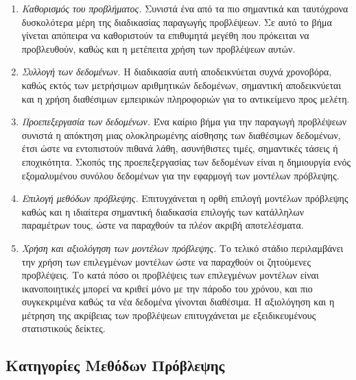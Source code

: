 \documentclass[diploma]{softlab-thesis}
\begin{document}
\begin{enumerate}
    \item \textit{Καθορισμός του προβλήματος.} Συνιστά ένα από τα πιο σημαντικά και ταυτόχρονα δυσκολότερα μέρη της διαδικασίας παραγωγής προβλέψεων. Σε αυτό το βήμα γίνεται απόπειρα να καθοριστούν τα επιθυμητά μεγέθη που πρόκειται να προβλευθούν, καθώς και η μετέπειτα χρήση των προβλέψεων αυτών.
    \item \textit{Συλλογή των δεδομένων.} Η διαδικασία αυτή αποδεικνύεται συχνά χρονοβόρα, καθώς εκτός των μετρήσιμων αριθμητικών δεδομένων, σημαντική αποδεικνύεται και η χρήση διαθέσιμων εμπειρικών πληροφοριών για το αντικείμενο προς μελέτη. 
    \item \textit{Προεπεξεργασία των δεδομένων.} Ένα καίριο βήμα για την παραγωγή προβλέψεων συνιστά η απόκτηση μιας ολοκληρωμένης αίσθησης των διαθέσιμων δεδομένων, έτσι ώστε να εντοπιστούν πιθανά λάθη, ασυνήθιστες τιμές, σημαντικές τάσεις ή εποχικότητα. Σκοπός της προεπεξεργασίας των δεδομένων είναι η δημιουργία ενός εξομαλυμένου συνόλου δεδομένων για την εφαρμογή των μοντέλων πρόβλεψης.
     \item \textit{Επιλογή μεθόδων πρόβλεψης.} Επιτυγχάνεται η ορθή επιλογή μοντέλων πρόβλεψης καθώς και η ιδιαίτερα σημαντική διαδικασία επιλογής των κατάλληλων παραμέτρων τους, ώστε να παραχθούν τα πλέον ακριβή αποτελέσματα. 
      \item \textit{Χρήση και αξιολόγηση των μοντέλων πρόβλεψης.} Το τελικό στάδιο περιλαμβάνει την χρήση των επιλεγμένων μοντέλων ώστε να παραχθούν οι ζητούμενες προβλέψεις. Το κατά πόσο οι προβλέψεις των επιλεγμένων μοντέλων είναι ικανοποιητικές μπορεί να κριθεί μόνο με την πάροδο του χρόνου, και πιο συγκεκριμένα καθώς τα νέα δεδομένα γίνονται διαθέσιμα. Η αξιολόγηση και η μέτρηση της ακρίβειας των προβλέψεων επιτυγχάνεται με εξειδικευμένους στατιστικούς δείκτες.
\end{enumerate}

\subsection{Κατηγορίες Μεθόδων Πρόβλεψης}
\end{document}
